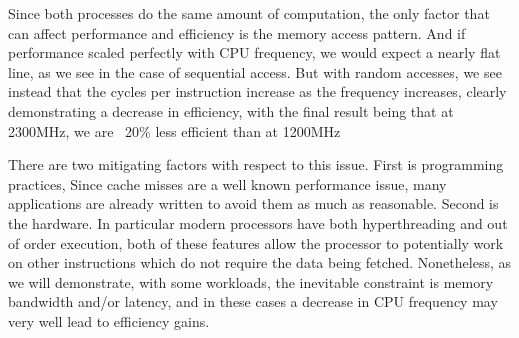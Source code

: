  Since both processes do the same amount of computation, the only factor that can affect performance and efficiency is the memory access pattern. And if performance scaled perfectly with CPU frequency, we would expect a nearly flat line, as we see in the case of sequential access. But with random accesses, we see instead that the cycles per instruction increase as the frequency increases, clearly demonstrating a decrease in efficiency, with the final result being that at 2300MHz, we are ~20\% less efficient than at 1200MHz

There are two mitigating factors with respect to this issue. First is programming practices, Since cache misses are a well known performance issue, many applications are already written to avoid them as much as reasonable. Second is the hardware. In particular modern processors have both hyperthreading and out of order execution, both of these features allow the processor to potentially work on other instructions which do not require the data being fetched. Nonetheless, as we will demonstrate, with some workloads, the inevitable constraint is memory bandwidth and/or latency, and in these cases a decrease in CPU frequency may very well lead to efficiency gains.



